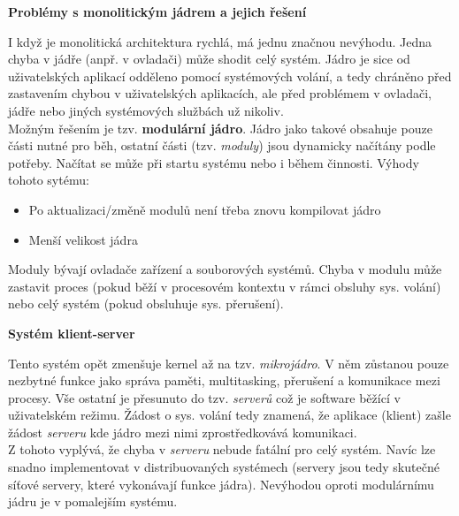\begin{large}
    \vspace{0,5cm}
    \textbf{Problémy s monolitickým jádrem a jejich řešení}\\
\end{large}

I když je monolitická architektura rychlá, má jednu značnou nevýhodu. Jedna chyba v jádře (anpř. v ovladači) může shodit celý systém. Jádro je sice od uživatelských aplikací odděleno pomocí systémových volání, a tedy chráněno před zastavením chybou v uživatelských aplikacích, ale před problémem v ovladači, jádře nebo jiných systémových službách už nikoliv.\\

Možným řešením je tzv. \textbf{modulární jádro}. Jádro jako takové obsahuje pouze části nutné pro běh, ostatní části (tzv. \textit{moduly}) jsou dynamicky načítány podle potřeby. Načítat se může při startu systému nebo i během činnosti. Výhody tohoto sytému:

\begin{itemize}
    \item Po aktualizaci/změně modulů není třeba znovu kompilovat jádro
    \item Menší velikost jádra
\end{itemize}

Moduly bývají ovladače zařízení a souborových systémů. Chyba v modulu může zastavit proces (pokud běží v procesovém kontextu v rámci obsluhy sys. volání) nebo celý systém (pokud obsluhuje sys. přerušení).

\newpage

\begin{Large}
    \vspace{0,5cm} 
    \textbf{Systém klient-server}\\
\end{Large}

Tento systém opět zmenšuje kernel až na tzv. \textit{mikrojádro}. V něm zůstanou pouze nezbytné funkce jako správa paměti, multitasking, přerušení a komunikace mezi procesy. Vše ostatní je přesunuto do tzv. \textit{serverů} což je software běžící v uživatelském režimu. Žádost o sys. volání tedy znamená, že aplikace (klient) zašle žádost \textit{serveru} kde jádro mezi nimi zprostředkovává komunikaci. \\

Z tohoto vyplývá, že chyba v \textit{serveru} nebude fatální pro celý systém. Navíc lze snadno implementovat v distribuovaných systémech (servery jsou tedy skutečné síťové servery, které vykonávají funkce jádra). Nevýhodou oproti modulárnímu jádru je v pomalejším systému. 

